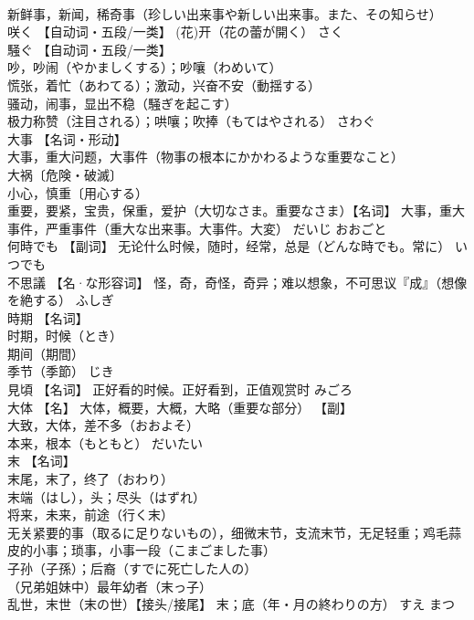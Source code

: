\documentclass[8pt]{extreport}
\begin{document}
\begin{CJK}{UTF8}{min}
\\	新鲜事，新闻，稀奇事（珍しい出来事や新しい出来事。また、その知らせ）		
\\	咲く	【自动词・五段/一类】 (花)开（花の蕾が開く）	さく	
\\	騒ぐ	【自动词・五段/一类】 
\\	吵，吵闹（やかましくする）；吵嚷（わめいて） 
\\	慌张，着忙（あわてる）；激动，兴奋不安（動揺する） 
\\	骚动，闹事，显出不稳（騒ぎを起こす） 
\\	极力称赞（注目される）；哄嚷；吹捧（もてはやされる）	さわぐ	
\\	大事	【名词・形动】 
\\	大事，重大问题，大事件（物事の根本にかかわるような重要なこと） 
\\	大祸〔危険・破滅〕 
\\	小心，慎重〔用心する） 
\\	重要，要紧，宝贵，保重，爱护（大切なさま。重要なさま）【名词】 大事，重大事件，严重事件（重大な出来事。大事件。大変）	だいじ おおごと	
\\	何時でも	【副词】 无论什么时候，随时，经常，总是（どんな時でも。常に）	いつでも	
\\	不思議	【名·な形容词】 怪，奇，奇怪，奇异；难以想象，不可思议『成』（想像を絶する）	ふしぎ	
\\	時期	【名词】 
\\	时期，时候（とき） 
\\	期间（期間） 
\\	季节（季節）	じき	
\\	見頃	【名词】 正好看的时候。正好看到，正值观赏时	みごろ	
\\	大体	【名】 大体，概要，大概，大略（重要な部分） 【副】 
\\	大致，大体，差不多（おおよそ） 
\\	本来，根本（もともと）	だいたい	
\\	末	【名词】 
\\	末尾，末了，终了（おわり） 
\\	末端（はし），头；尽头（はずれ） 
\\	将来，未来，前途（行く末） 
\\	无关紧要的事（取るに足りないもの），细微末节，支流末节，无足轻重；鸡毛蒜皮的小事；琐事，小事一段（こまごました事） 
\\	子孙（子孫）；后裔（すでに死亡した人の） 
\\	（兄弟姐妹中）最年幼者（末っ子） 
\\	乱世，末世（末の世）【接头/接尾】 末；底（年・月の終わりの方）	すえ まつ	

\end{CJK}
\end{document}
